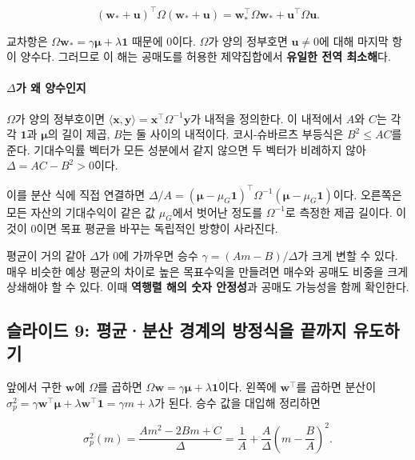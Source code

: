 \documentclass[11pt,a4paper]{article}
\begin{document}
\[
(\mathbf w_*+\mathbf u)^\top\Omega(\mathbf w_*+\mathbf u)
=\mathbf w_*^\top\Omega\mathbf w_*+\mathbf u^\top\Omega\mathbf u.
\]

교차항은 $\Omega\mathbf w_*=\gamma\boldsymbol\mu+\lambda\mathbf1$ 때문에 0이다. $\Omega$가 양의 정부호면 $\mathbf u\ne0$에 대해 마지막 항이 양수다. 그러므로 이 해는 공매도를 허용한 제약집합에서 \textbf{유일한 전역 최소해}다.
\par

\paragraph{$\Delta$가 왜 양수인지}

$\Omega$가 양의 정부호이면 $\langle\mathbf x,\mathbf y\rangle=\mathbf x^\top\Omega^{-1}\mathbf y$가 내적을 정의한다. 이 내적에서 $A$와 $C$는 각각 $\mathbf1$과 $\boldsymbol\mu$의 길이 제곱, $B$는 둘 사이의 내적이다. 코시-슈바르츠 부등식은 $B^2\le AC$를 준다. 기대수익률 벡터가 모든 성분에서 같지 않으면 두 벡터가 비례하지 않아 $\Delta=AC-B^2>0$이다.
\par

이를 분산 식에 직접 연결하면 $\Delta/A=(\boldsymbol\mu-\mu_G\mathbf1)^\top\Omega^{-1}(\boldsymbol\mu-\mu_G\mathbf1)$이다. 오른쪽은 모든 자산의 기대수익이 같은 값 $\mu_G$에서 벗어난 정도를 $\Omega^{-1}$로 측정한 제곱 길이다. 이것이 0이면 목표 평균을 바꾸는 독립적인 방향이 사라진다.
\par

평균이 거의 같아 $\Delta$가 0에 가까우면 승수 $\gamma=(Am-B)/\Delta$가 크게 변할 수 있다. 매우 비슷한 예상 평균의 차이로 높은 목표수익을 만들려면 매수와 공매도 비중을 크게 상쇄해야 할 수 있다. 이때 \textbf{역행렬 해의 숫자 안정성}과 공매도 가능성을 함께 확인한다.
\par

\subsection{슬라이드 9: 평균·분산 경계의 방정식을 끝까지 유도하기}

앞에서 구한 $\mathbf w$에 $\Omega$를 곱하면 $\Omega\mathbf w=\gamma\boldsymbol\mu+\lambda\mathbf1$이다. 왼쪽에 $\mathbf w^\top$를 곱하면 분산이 $\sigma_p^2=\gamma\mathbf w^\top\boldsymbol\mu+\lambda\mathbf w^\top\mathbf1=\gamma m+\lambda$가 된다. 승수 값을 대입해 정리하면
\par

\[
\sigma_p^2(m)=\frac{Am^2-2Bm+C}{\Delta}
=\frac1A+\frac{A}{\Delta}\left(m-\frac BA\right)^2.
\]
\end{document}
